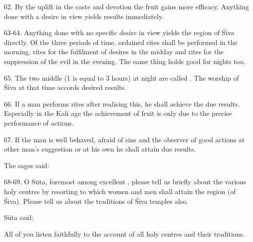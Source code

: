 62. By the uplift in the caste and devotion the fruit gains more efficacy.
Anything done with a desire in view yields results immediately.

63-64. Anything done with no specific desire in view yields the region of Śiva
directly. Of the three periods of time, ordained rites shall be performed in
the morning, rites for the fulfilment of desires in the midday and rites for
the suppression of the evil in the evening. The same thing holds good for
nights too.

65. The two middle  (1  is equal to 3 hours) at night are
called . The worship of Śiva at that time accords desired results.

66. If a man performs rites after realising this, he shall achieve the due
results. Especially in the Kali age the achievement of fruit is only due to
the precise performance of actions.

67. If the man is well behaved, afraid of sins and the observer of good actions
at other man’s suggestion or at his own he shall attain due results.

The sages said:

68-69. O Sūta, foremost among excellent , please tell us briefly
about the various holy centres by resorting to which women and men shall attain
the region (of Śiva). Please tell us about the traditions of Śiva temples also.

Sūta said:

All of you listen faithfully to the account of all holy centres and their
traditions.
